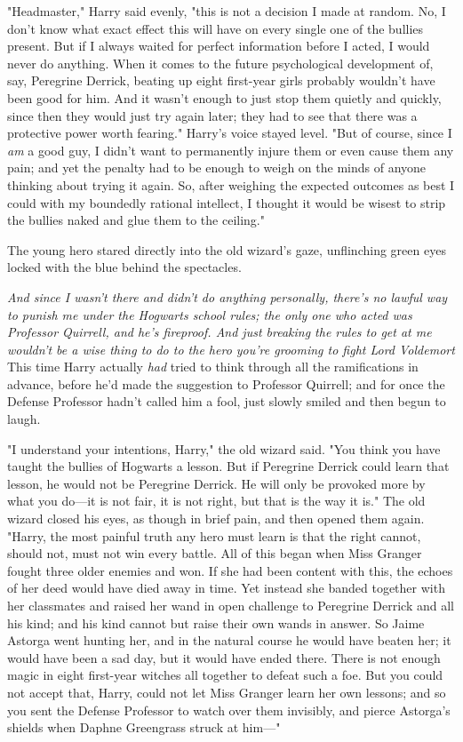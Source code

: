 "Headmaster," Harry said evenly, "this is not a decision I made at random. No,
I don't know what exact effect this will have on every single one of the
bullies present. But if I always waited for perfect information before I acted,
I would never do anything. When it comes to the future psychological
development of, say, Peregrine Derrick, beating up eight first-year girls
probably wouldn't have been good for him. And it wasn't enough to just stop
them quietly and quickly, since then they would just try again later; they had
to see that there was a protective power worth fearing." Harry's voice stayed
level. "But of course, since I \emph{am} a good guy, I didn't want to
permanently injure them or even cause them any pain; and yet the penalty had to
be enough to weigh on the minds of anyone thinking about trying it again. So,
after weighing the expected outcomes as best I could with my boundedly rational
intellect, I thought it would be wisest to strip the bullies naked and glue
them to the ceiling."

The young hero stared directly into the old wizard's gaze, unflinching green
eyes locked with the blue behind the spectacles.

\emph{And since I wasn't there and didn't do anything personally, there's no
lawful way to punish me under the Hogwarts school rules; the only one who acted
was Professor Quirrell, and he's fireproof. And just breaking the rules to get
at me wouldn't be a wise thing to do to the hero you're grooming to fight Lord
Voldemort{\el}} This time Harry actually \emph{had} tried to think through
all the ramifications in advance, before he'd made the suggestion to Professor
Quirrell; and for once the Defense Professor hadn't called him a fool, just
slowly smiled and then begun to laugh.

"I understand your intentions, Harry," the old wizard said. "You think you have
taught the bullies of Hogwarts a lesson. But if Peregrine Derrick could learn
that lesson, he would not be Peregrine Derrick. He will only be provoked more
by what you do—it is not fair, it is not right, but that is the way it is."
The old wizard closed his eyes, as though in brief pain, and then opened them
again. "Harry, the most painful truth any hero must learn is that the right
cannot, should not, must not win every battle. All of this began when Miss
Granger fought three older enemies and won. If she had been content with this,
the echoes of her deed would have died away in time. Yet instead she banded
together with her classmates and raised her wand in open challenge to Peregrine
Derrick and all his kind; and his kind cannot but raise their own wands in
answer. So Jaime Astorga went hunting her, and in the natural course he would
have beaten her; it would have been a sad day, but it would have ended there.
There is not enough magic in eight first-year witches all together to defeat
such a foe. But you could not accept that, Harry, could not let Miss Granger
learn her own lessons; and so you sent the Defense Professor to watch over them
invisibly, and pierce Astorga's shields when Daphne Greengrass struck at him—"

